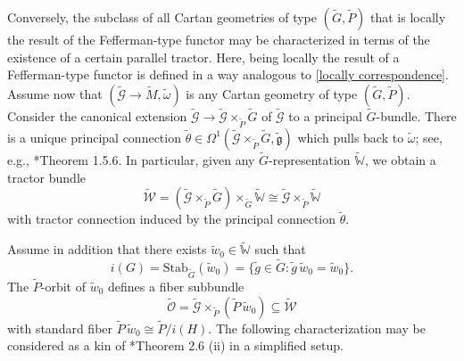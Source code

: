 \documentclass[11pt]{amsart}
\newtheorem{theorem}[proposition]{Theorem}
\begin{document}
Conversely, the subclass of all Cartan geometries of type $(\tilde G,\tilde P)$ that is locally the result of the Fefferman-type functor may be characterized in terms of the existence of a certain parallel tractor. Here, being locally the result of a Fefferman-type functor is defined in a way analogous to \cref{locally correspondence}. Assume now that $(\tilde{\mathcal G}\to \tilde M,\tilde\omega)$ is any Cartan geometry of type $(\tilde G,\tilde P)$. Consider the canonical extension $\tilde{\mathcal G}\to \tilde{\mathcal G}\times_{\tilde P}\tilde G$ of $\tilde{\mathcal G}$ to a principal $\tilde G$-bundle. There is a unique principal connection $\tilde\theta\in\Omega^1(\tilde{\mathcal G}\times_{\tilde P}\tilde G,\tilde{\mathfrak g})$ which pulls back to $\tilde\omega$; see, e.g., \cite{Book}*{Theorem 1.5.6}. In particular, given any $\tilde G$-representation $\tilde{\mathbb W}$, we obtain a tractor bundle \[\tilde{\mathcal W}=(\tilde{\mathcal G}\times_{\tilde P}\tilde G)\times_{\tilde G}\tilde{\mathbb W}\cong\tilde{\mathcal G}\times_{\tilde P}\tilde{\mathbb W}\] with tractor connection induced by the principal connection $\tilde\theta$.

Assume in addition that there exists $\tilde w_0\in\tilde{\mathbb W}$ such that 
\[i(G)=\mathrm{Stab}_{\tilde G}(\tilde w_0)
=\{\tilde g\in\tilde G:\tilde g\,\tilde w_0=\tilde w_0\}.\]
The $\tilde P$-orbit of $\tilde w_0$ defines a fiber subbundle
\[\tilde{\mathcal O}=\tilde{\mathcal G}\times_{\tilde P}(\tilde P\,\tilde w_0)\subseteq\tilde{\mathcal W}\]
with standard fiber $\tilde P\,\tilde w_0\cong\tilde P/i(H)$. The following characterization may be considered as a kin of \cite{CGH}*{Theorem 2.6 (ii)} in a simplified setup.
\end{document}
